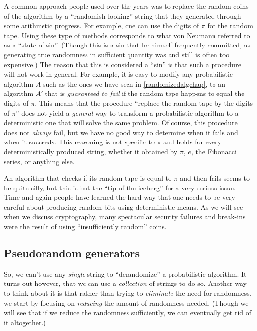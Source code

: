 A common approach people used over the years was to replace the random
coins of the algorithm by a ``randomish looking'' string that they
generated through some arithmetic progress. For example, one can use the
digits of \(\pi\) for the random tape. Using these type of methods
corresponds to what von Neumann referred to as a ``state of sin''.
(Though this is a sin that he himself frequently committed, as
generating true randomness in sufficient quantity was and still is often
too expensive.) The reason that this is considered a ``sin'' is that
such a procedure will not work in general. For example, it is easy to
modify any probabilistic algorithm \(A\) such as the ones we have seen
in \cref{randomizedalgchap}, to an algorithm \(A'\) that is
\emph{guaranteed to fail} if the random tape happens to equal the digits
of \(\pi\). This means that the procedure ``replace the random tape by
the digits of \(\pi\)'' does not yield a \emph{general} way to transform
a probabilistic algorithm to a deterministic one that will solve the
same problem. Of course, this procedure does not \emph{always} fail, but
we have no good way to determine when it fails and when it succeeds.
This reasoning is not specific to \(\pi\) and holds for every
deterministically produced string, whether it obtained by \(\pi\),
\(e\), the Fibonacci series, or anything else.

An algorithm that checks if its random tape is equal to \(\pi\) and then
fails seems to be quite silly, but this is but the ``tip of the
iceberg'' for a very serious issue. Time and again people have learned
the hard way that one needs to be very careful about producing random
bits using deterministic means. As we will see when we discuss
cryptography, many spectacular security failures and break-ins were the
result of using ``insufficiently random'' coins.

\subsection{Pseudorandom generators}\label{Pseudorandom-generators}

So, we can't use any \emph{single} string to ``derandomize'' a
probabilistic algorithm. It turns out however, that we can use a
\emph{collection} of strings to do so. Another way to think about it is
that rather than trying to \emph{eliminate} the need for randomness, we
start by focusing on \emph{reducing} the amount of randomness needed.
(Though we will see that if we reduce the randomness sufficiently, we
can eventually get rid of it altogether.)

